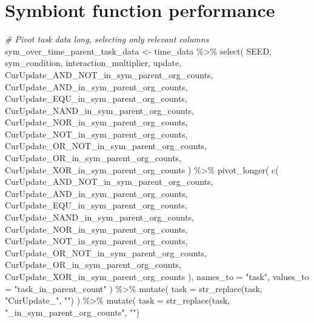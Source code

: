 \documentclass[
]{book}
\newenvironment{Shaded}{\begin{snugshade}}{\end{snugshade}}
\newcommand{\AttributeTok}[1]{\textcolor[rgb]{0.77,0.63,0.00}{#1}}
\newcommand{\CommentTok}[1]{\textcolor[rgb]{0.56,0.35,0.01}{\textit{#1}}}
\newcommand{\FunctionTok}[1]{\textcolor[rgb]{0.00,0.00,0.00}{#1}}
\newcommand{\NormalTok}[1]{#1}
\newcommand{\OtherTok}[1]{\textcolor[rgb]{0.56,0.35,0.01}{#1}}
\newcommand{\SpecialCharTok}[1]{\textcolor[rgb]{0.00,0.00,0.00}{#1}}
\newcommand{\StringTok}[1]{\textcolor[rgb]{0.31,0.60,0.02}{#1}}
\begin{document}
\hypertarget{symbiont-function-performance-1}{%
\section{Symbiont function performance}\label{symbiont-function-performance-1}}

\begin{Shaded}
\begin{Highlighting}[]
\CommentTok{\# Pivot task data long, selecting only relevant columns}
\NormalTok{sym\_over\_time\_parent\_task\_data }\OtherTok{\textless{}{-}}\NormalTok{ time\_data }\SpecialCharTok{\%\textgreater{}\%}
  \FunctionTok{select}\NormalTok{(}
\NormalTok{    SEED,}
\NormalTok{    sym\_condition,}
\NormalTok{    interaction\_multiplier,}
\NormalTok{    update,}
\NormalTok{    CurUpdate\_AND\_NOT\_in\_sym\_parent\_org\_counts,}
\NormalTok{    CurUpdate\_AND\_in\_sym\_parent\_org\_counts,}
\NormalTok{    CurUpdate\_EQU\_in\_sym\_parent\_org\_counts,}
\NormalTok{    CurUpdate\_NAND\_in\_sym\_parent\_org\_counts,}
\NormalTok{    CurUpdate\_NOR\_in\_sym\_parent\_org\_counts,}
\NormalTok{    CurUpdate\_NOT\_in\_sym\_parent\_org\_counts,}
\NormalTok{    CurUpdate\_OR\_NOT\_in\_sym\_parent\_org\_counts,}
\NormalTok{    CurUpdate\_OR\_in\_sym\_parent\_org\_counts,}
\NormalTok{    CurUpdate\_XOR\_in\_sym\_parent\_org\_counts}
\NormalTok{  ) }\SpecialCharTok{\%\textgreater{}\%}
  \FunctionTok{pivot\_longer}\NormalTok{(}
    \FunctionTok{c}\NormalTok{(}
\NormalTok{      CurUpdate\_AND\_NOT\_in\_sym\_parent\_org\_counts,}
\NormalTok{      CurUpdate\_AND\_in\_sym\_parent\_org\_counts,}
\NormalTok{      CurUpdate\_EQU\_in\_sym\_parent\_org\_counts,}
\NormalTok{      CurUpdate\_NAND\_in\_sym\_parent\_org\_counts,}
\NormalTok{      CurUpdate\_NOR\_in\_sym\_parent\_org\_counts,}
\NormalTok{      CurUpdate\_NOT\_in\_sym\_parent\_org\_counts,}
\NormalTok{      CurUpdate\_OR\_NOT\_in\_sym\_parent\_org\_counts,}
\NormalTok{      CurUpdate\_OR\_in\_sym\_parent\_org\_counts,}
\NormalTok{      CurUpdate\_XOR\_in\_sym\_parent\_org\_counts}
\NormalTok{    ),}
    \AttributeTok{names\_to =} \StringTok{"task"}\NormalTok{,}
    \AttributeTok{values\_to =} \StringTok{"task\_in\_parent\_count"}
\NormalTok{  ) }\SpecialCharTok{\%\textgreater{}\%}
  \FunctionTok{mutate}\NormalTok{(}
    \AttributeTok{task =} \FunctionTok{str\_replace}\NormalTok{(task, }\StringTok{"CurUpdate\_"}\NormalTok{, }\StringTok{""}\NormalTok{)}
\NormalTok{  ) }\SpecialCharTok{\%\textgreater{}\%}
  \FunctionTok{mutate}\NormalTok{(}
    \AttributeTok{task =} \FunctionTok{str\_replace}\NormalTok{(task, }\StringTok{"\_in\_sym\_parent\_org\_counts"}\NormalTok{, }\StringTok{""}\NormalTok{)}

\end{Highlighting}
\end{Shaded}
\end{document}
